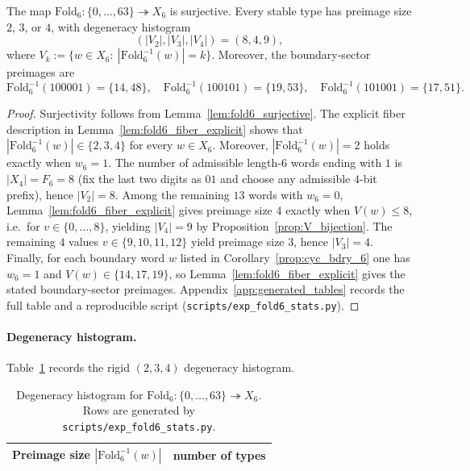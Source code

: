 \begin{theorem}[Finite folding statistics at $m=6$]\label{thm:fold6_stats}
The map $\mathrm{Fold}_6:\{0,\dots,63\}\twoheadrightarrow X_6$ is surjective.
Every stable type has preimage size $2$, $3$, or $4$, with degeneracy histogram
\[
(|V_2|,|V_3|,|V_4|)=(8,4,9),
\]
where $V_k:=\{w\in X_6:\ |\mathrm{Fold}_6^{-1}(w)|=k\}$.
Moreover, the boundary-sector preimages are
\[
\mathrm{Fold}_6^{-1}(100001)=\{14,48\},\quad
\mathrm{Fold}_6^{-1}(100101)=\{19,53\},\quad
\mathrm{Fold}_6^{-1}(101001)=\{17,51\}.
\]
\end{theorem}
\begin{proof}
Surjectivity follows from Lemma~\ref{lem:fold6_surjective}.
The explicit fiber description in Lemma~\ref{lem:fold6_fiber_explicit} shows that $|\mathrm{Fold}_6^{-1}(w)|\in\{2,3,4\}$ for every $w\in X_6$.
Moreover, $|\mathrm{Fold}_6^{-1}(w)|=2$ holds exactly when $w_6=1$.
The number of admissible length-$6$ words ending with $1$ is $|X_4|=F_6=8$ (fix the last two digits as $01$ and choose any admissible $4$-bit prefix), hence $|V_2|=8$.
Among the remaining $13$ words with $w_6=0$, Lemma~\ref{lem:fold6_fiber_explicit} gives preimage size $4$ exactly when $V(w)\le 8$, i.e.\ for $v\in\{0,\dots,8\}$, yielding $|V_4|=9$ by Proposition~\ref{prop:V_bijection}.
The remaining $4$ values $v\in\{9,10,11,12\}$ yield preimage size $3$, hence $|V_3|=4$.
Finally, for each boundary word $w$ listed in Corollary~\ref{prop:cyc_bdry_6} one has $w_6=1$ and $V(w)\in\{14,17,19\}$, so Lemma~\ref{lem:fold6_fiber_explicit} gives the stated boundary-sector preimages.
Appendix~\ref{app:generated_tables} records the full table and a reproducible script (\texttt{scripts/exp\_fold6\_stats.py}).
\end{proof}

\paragraph{Degeneracy histogram.}
Table~\ref{tab:fold6_degeneracy} records the rigid $(2,3,4)$ degeneracy histogram.

\begin{table}[H]
\centering
\small
\setlength{\tabcolsep}{10pt}
\renewcommand{\arraystretch}{1.15}
\begin{tabular}{rr}
\toprule
Preimage size $|\mathrm{Fold}_6^{-1}(w)|$ & number of types \\
\midrule

\end{tabular}
\caption{Degeneracy histogram for $\mathrm{Fold}_6:\{0,\dots,63\}\twoheadrightarrow X_6$. Rows are generated by \texttt{scripts/exp\_fold6\_stats.py}.}
\label{tab:fold6_degeneracy}
\end{table}

